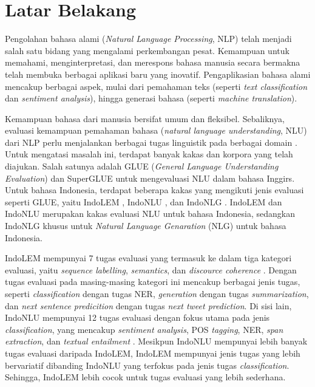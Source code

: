 \section{Latar Belakang}
\label{sec:latar-belakang}

Pengolahan bahasa alami (\textit{Natural Language Processing}, NLP) telah menjadi salah satu bidang yang mengalami perkembangan pesat. Kemampuan untuk memahami, menginterpretasi, dan merespons bahasa manusia secara bermakna telah membuka berbagai aplikasi baru yang inovatif. Pengaplikasian bahasa alami mencakup berbagai aspek, mulai dari pemahaman teks (seperti \textit{text classification} dan \textit{sentiment analysis}), hingga generasi bahasa (seperti \textit{machine translation}).

Kemampuan bahasa dari manusia bersifat umum dan fleksibel. Sebaliknya, evaluasi kemampuan pemahaman bahasa (\textit{natural language understanding}, NLU) dari NLP perlu menjalankan berbagai tugas linguistik pada berbagai domain \parencite{glue}. Untuk mengatasi masalah ini, terdapat banyak kakas dan korpora yang telah diajukan. Salah satunya adalah GLUE (\textit{General Language Understanding Evaluation}) \parencite{glue} dan SuperGLUE \parencite{superglue} untuk mengevaluasi NLU dalam bahasa Inggirs. Untuk bahasa Indonesia, terdapat beberapa kakas yang mengikuti jenis evaluasi seperti GLUE, yaitu IndoLEM \parencite{indolem}, IndoNLU \parencite{indonlu}, dan IndoNLG \parencite{indonlg}. IndoLEM dan IndoNLU merupakan kakas evaluasi NLU untuk bahasa Indonesia, sedangkan IndoNLG khusus untuk \textit{Natural Language Genaration} (NLG) untuk bahasa Indonesia.

IndoLEM mempunyai 7 tugas evaluasi yang termasuk ke dalam tiga kategori evaluasi, yaitu \textit{sequence labelling}, \textit{semantics}, dan \textit{discource coherence} \parencite{indolem}. Dengan tugas evaluasi pada masing-masing kategori ini mencakup berbagai jenis tugas, seperti \textit{classification} dengan tugas NER, \textit{generation} dengan tugas \textit{summarization}, dan \textit{next sentence predicition} dengan tugas \textit{next tweet prediction}. Di sisi lain, IndoNLU mempunyai 12 tugas evaluasi dengan fokus utama pada jenis \textit{classification}, yang mencakup \textit{sentiment analysis}, POS \textit{tagging}, NER, \textit{span extraction}, dan \textit{textual entailment} \parencite{indonlu}. Mesikpun IndoNLU mempunyai lebih banyak tugas evaluasi daripada IndoLEM, IndoLEM mempunyai jenis tugas yang lebih bervariatif dibanding IndoNLU yang terfokus pada jenis tugas \textit{classification}. Sehingga, IndoLEM lebih cocok untuk tugas evaluasi yang lebih sederhana.

